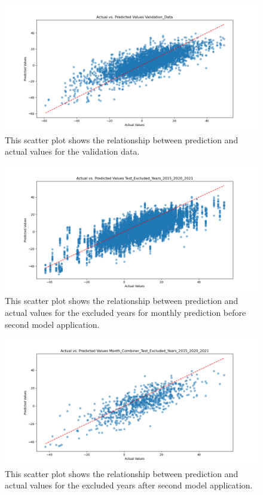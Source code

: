 \documentclass{article}
\begin{document}
\begin{figure}[H]
	\centering
	\includegraphics[width=1.0\textwidth]{./plots/scatter_Validation_Data_monthly.png}
	\caption{\label{fig:month_value_combination_scatter_validation_data_monthly}This scatter plot shows the relationship between prediction and actual values for the validation data.}
\end{figure}

\begin{figure}[H]
	\centering
	\includegraphics[width=1.0\textwidth]{./plots/scatter_Test_Excluded_Years_2015_2020_2021_monthly.png}
	\caption{\label{fig:month_value_combination_scatter_excluded_years_monthly}This scatter plot shows the relationship between prediction and actual values for the excluded years for monthly prediction before second model application.}
\end{figure}

\begin{figure}[H]
	\centering
	\includegraphics[width=1.0\textwidth]{./plots/scatter_Month_Combiner_Test_Excluded_Years_2015_2020_2021.png}
	\caption{\label{fig:combined_month_output_scatter_excluded_years}This scatter plot shows the relationship between prediction and actual values for the excluded years after second model application.}
\end{figure}
\end{document}
